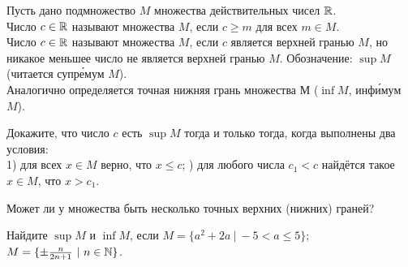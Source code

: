 \documentclass[a4paper,11pt]{article}
\begin{document}



 Пусть дано подмножество $M$ множества действительных чисел $\mathbb{R}$. \\
Число  $c\in\mathbb{R}$ называют  множества $M$, если $c\geq m$ для всех $m\in M$.\\
Число  $c\in\mathbb{R}$ называют  множества $M$,
если $c$ является верхней гранью %
$M$, но никакое меньшее число
не является верхней гранью %
$M$.
Обозначение: $\sup M$ (читается  супр\'емум  %
$M$).\\
Аналогично определяется точная нижняя грань множества $М$ ($\inf M$,  инф\'имум $M$).






Докажите, что число $c$ есть $\sup M$ тогда и только тогда, когда
выполнены два условия:\\
1) для всех $x\in M$ верно, что $x\leq c$; ) для любого числа $c_1<c$ найд\"ется такое $x\in M$, что $x>c_1$.


 Может ли у множества быть несколько точных верхних
(нижних) граней?

Найдите $\sup M$ и $\inf M$, если
$M=\{a^2+2a\ |\  -5<a\leq 5\}$;
$M=\{\pm \frac{n}{2n+1}\ |\ n\in\N\}$.
\end{document}
